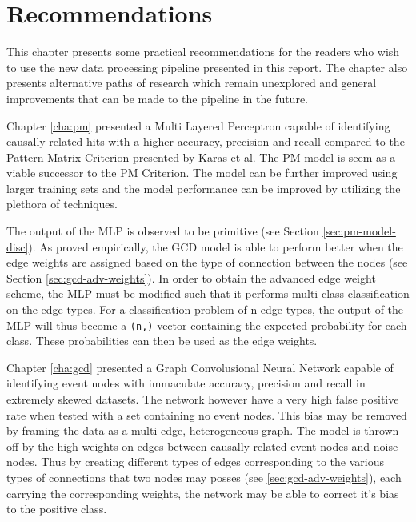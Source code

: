 
\chapter{Recommendations} %
\label{cha:rec}

% 


This chapter presents some practical recommendations for the readers
who wish to use the new data processing pipeline presented in this
report. The chapter also presents alternative paths of research which
remain unexplored and general improvements that can be made to the
pipeline in the future.

Chapter \ref{cha:pm} presented a Multi Layered Perceptron capable of
identifying causally related hits with a higher accuracy, precision
and recall compared to the Pattern Matrix Criterion presented by Karas
et al. The PM model is seem as a viable successor to the PM Criterion.
The model can be further improved using larger training sets and the
model performance can be improved by utilizing the plethora of
techniques.

The output of the MLP is observed to be primitive (see Section
\ref{sec:pm-model-disc}). As proved empirically, the GCD model is able
to perform better when the edge weights are assigned based on the type
of connection between the nodes (see Section
\ref{sec:gcd-adv-weights}). In order to obtain the advanced edge
weight scheme, the MLP must be modified such that it performs
multi-class classification on the edge types. For a classification
problem of n edge types, the output of the MLP will thus become a
\texttt{(n,)} vector containing the expected probability for each
class. These probabilities can then be used as the edge weights.

Chapter \ref{cha:gcd} presented a Graph Convolusional Neural Network
capable of identifying event nodes with immaculate accuracy, precision
and recall in extremely skewed datasets. The network however have a
very high false positive rate when tested with a set containing no
event nodes. This bias may be removed by framing the data as a
multi-edge, heterogeneous graph. The model is thrown off by the high
weights on edges between causally related event nodes and noise nodes.
Thus by creating different types of edges corresponding to the various
types of connections that two nodes may posses (see
\ref{sec:gcd-adv-weights}), each carrying the corresponding weights,
the network may be able to correct it's bias to the positive class.

